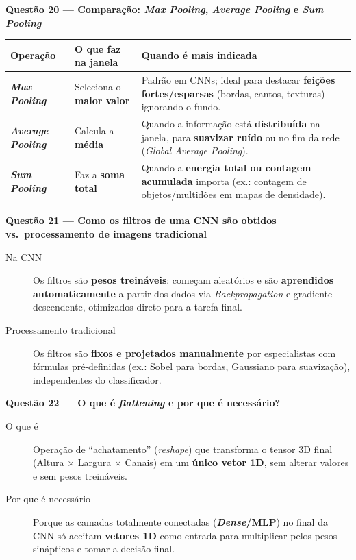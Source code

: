 \documentclass[10pt,a4paper]{article}
\newcommand{\questao}[2]{%
  \needspace{4\baselineskip}%
  \vspace{0.45em}\noindent
  {\color{azulufersa}\bfseries Questão #1 --- #2}\par\nopagebreak\vspace{0.15em}\noindent\ignorespaces%
}
\begin{document}
\questao{20}{Comparação: \emph{Max Pooling}, \emph{Average Pooling} e \emph{Sum Pooling}}
\begin{center}
\small
\begin{tabularx}{\linewidth}{@{} l l X @{}}
  \toprule
  \textbf{Operação} & \textbf{O que faz na janela} & \textbf{Quando é mais indicada} \\
  \midrule
  \textbf{\emph{Max Pooling}} & Seleciona o \textbf{maior valor} & Padrão em CNNs; ideal para destacar \textbf{feições fortes/esparsas} (bordas, cantos, texturas) ignorando o fundo. \\
  \textbf{\emph{Average Pooling}} & Calcula a \textbf{média} & Quando a informação está \textbf{distribuída} na janela, para \textbf{suavizar ruído} ou no fim da rede (\emph{Global Average Pooling}). \\
  \textbf{\emph{Sum Pooling}} & Faz a \textbf{soma total} & Quando a \textbf{energia total ou contagem acumulada} importa (ex.: contagem de objetos/multidões em mapas de densidade). \\
  \bottomrule
\end{tabularx}
\end{center}

\questao{21}{Como os filtros de uma CNN são obtidos vs.\ processamento de imagens tradicional}
\begin{description}
  \item[Na CNN] Os filtros são \textbf{pesos treináveis}: começam aleatórios e são \textbf{aprendidos automaticamente} a partir dos dados via \emph{Backpropagation} e gradiente descendente, otimizados direto para a tarefa final.
  \item[Processamento tradicional] Os filtros são \textbf{fixos e projetados manualmente} por especialistas com fórmulas pré-definidas (ex.: Sobel para bordas, Gaussiano para suavização), independentes do classificador.
\end{description}

\questao{22}{O que é \emph{flattening} e por que é necessário?}
\begin{description}
  \item[O que é] Operação de \enquote{achatamento} (\emph{reshape}) que transforma o tensor 3D final (Altura $\times$ Largura $\times$ Canais) em um \textbf{único vetor 1D}, sem alterar valores e sem pesos treináveis.
  \item[Por que é necessário] Porque as camadas totalmente conectadas (\textbf{\emph{Dense}/MLP}) no final da CNN só aceitam \textbf{vetores 1D} como entrada para multiplicar pelos pesos sinápticos e tomar a decisão final.
\end{description}
\end{document}
